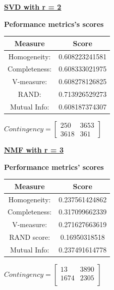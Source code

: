 \documentclass{report}
\begin{document}
\underline{\textbf{SVD with r = 2}} 

\begin{center}
	\textbf{Peformance metrics's scores} \\  \vspace{10pt}
	\begin{tabular}{*{2}{c}}
		\toprule
		\textbf{Measure} & \textbf{Score} \\
		\midrule
		Homogeneity: & 0.608223241581 \\
		\midrule
		Completeness: & 0.608333021975 \\
		\midrule
		V-measure: & 0.608278126825 \\
		\midrule
		RAND: & 0.713926529273 \\
		\midrule
		Mutual Info: & 0.608187374307 \\
		\bottomrule
	\end{tabular}
	\qquad
	$Contingency = \left[\begin{array}{*{2}{c}}
		250 & 3653 \\
		3618 & 361 
			\end{array}\right]
		$
\end{center}
\newpage


\underline{\textbf{NMF with r = 3}} 

\begin{center}
	\textbf{Performance metrics' scores} \\ \vspace{10pt}	
	\begin{tabular}{*{2}{c}}
		\toprule
		\textbf{Measure} & \textbf{Score} \\
		\midrule
		Homogeneity: & 0.237561424862 \\
		\midrule
		Completeness: 		& 0.317099662339 \\
		\midrule
		V-measure:			& 0.271627663619 \\
		\midrule
		RAND score: 		& 0.16950318518 \\
		\midrule
		Mutual Info: 		& 0.237491614778 \\
		\bottomrule
	\end{tabular}
	\qquad
	$Contingency = \left[\begin{array}{*{2}{c}}
		13 & 3890 \\
		1674 & 2305 \\
			\end{array}\right]
		$
\end{center}
\\  \vspace{20pt}
\end{document}
